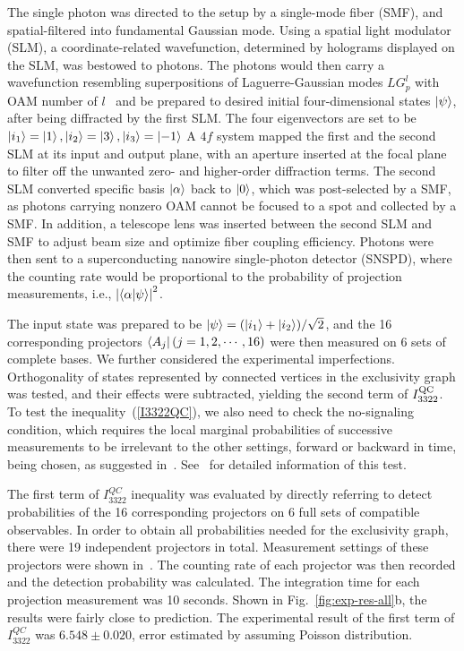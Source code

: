 \documentclass[prl,letterpaper,english,reprint,nofootinbib,aps,superscriptaddress,showpacs,showkeys]{revtex4-1}
\theoremstyle{definition}
\theoremstyle{remark}
\begin{document}
 The single photon was directed to the setup by a single-mode fiber (SMF), and spatial-filtered into fundamental Gaussian mode.
 Using a spatial light modulator (SLM), a coordinate-related wavefunction, determined by holograms displayed on the SLM, was bestowed to photons.
 The photons would then carry a wavefunction resembling superpositions of Laguerre-Gaussian modes $LG_p^l$ with OAM number of $l$~\cite{allen92} and be prepared to desired initial four-dimensional states $\ket{\psi}$, after being diffracted by the first SLM. The four eigenvectors are set to be $\ket{i_1} = \ket{1}, \ket{i_2} = \ket{3}, \ket{i_3} = \ket{-1}$
 A $4f$ system mapped the first and the second SLM at its input and output plane, with an aperture inserted at the focal plane to filter off the unwanted zero- and higher-order diffraction terms.
 The second SLM converted specific basis $\ket{\alpha}$ back to $\ket{0}$, which was post-selected by a SMF, as photons carrying nonzero OAM cannot be focused to a spot and collected by a SMF.
 In addition, a telescope lens was inserted between the second SLM and SMF to adjust beam size and optimize fiber coupling efficiency.
 Photons were then sent to a superconducting nanowire single-photon detector (SNSPD), where the counting rate would be proportional to the probability of projection measurements, i.e., $\left|\braket{\alpha|\psi}\right|^2$.

 The input state was prepared to be $\ket{\psi} = (\ket{i_1}+\ket{i_2})/\sqrt{2}$, and the 16 corresponding projectors $\bra{A_j}(j=1,2,\cdots,16)$ were then measured on 6 sets of complete bases.
 We further considered the experimental imperfections. Orthogonality of states represented by connected vertices in the exclusivity graph was tested, and their effects were subtracted, yielding the second term of $I_{3322}^{\rm QC}$.
 To test the inequality~(\ref{I3322QC}), we also need to check the no-signaling condition, which requires the local marginal probabilities of successive measurements to be irrelevant to the other settings, forward or backward in time, being chosen, as suggested in~\cite{cabello16}. See~\cite{SM} for detailed information of this test.

 The first term of $I_{3322}^{QC}$ inequality was evaluated by directly referring to detect probabilities of the 16 corresponding projectors on $6$ full sets of compatible observables. In order to obtain all probabilities needed for the exclusivity graph, there were 19 independent projectors in total.
 Measurement settings of these projectors were shown in~\cite{SM}.
 The counting rate of each projector was then recorded and the detection probability was calculated. The integration time for each projection measurement was 10 seconds. Shown in Fig.~\ref{fig:exp-res-all}b, the results were fairly close to prediction.
 The experimental result of the first term of $I_{3322}^{QC}$ was $6.548 \pm 0.020$, error estimated by assuming Poisson distribution.
\end{document}
